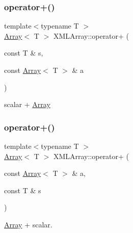 \subsubsection{\texorpdfstring{operator+()}{operator+()}\hspace{0.1cm}{\footnotesize\ttfamily [5/6]}}
{\footnotesize\ttfamily template$<$typename T $>$ \\
\mbox{\hyperlink{classXMLArray_1_1Array}{Array}}$<$ T $>$ X\+M\+L\+Array\+::operator+ (\begin{DoxyParamCaption}\item[{const T \&}]{s,  }\item[{const \mbox{\hyperlink{classXMLArray_1_1Array}{Array}}$<$ T $>$ \&}]{a }\end{DoxyParamCaption})\hspace{0.3cm}{\ttfamily [inline]}}



scalar + \mbox{\hyperlink{classXMLArray_1_1Array}{Array}} 

\mbox{\label{namespaceXMLArray_a1276f5294299ad880d814c929988bf93}} 
\subsubsection{\texorpdfstring{operator+()}{operator+()}\hspace{0.1cm}{\footnotesize\ttfamily [6/6]}}
{\footnotesize\ttfamily template$<$typename T $>$ \\
\mbox{\hyperlink{classXMLArray_1_1Array}{Array}}$<$ T $>$ X\+M\+L\+Array\+::operator+ (\begin{DoxyParamCaption}\item[{const \mbox{\hyperlink{classXMLArray_1_1Array}{Array}}$<$ T $>$ \&}]{a,  }\item[{const T \&}]{s }\end{DoxyParamCaption})\hspace{0.3cm}{\ttfamily [inline]}}



\mbox{\hyperlink{classXMLArray_1_1Array}{Array}} + scalar. 

\mbox{\label{namespaceXMLArray_abf0b390db9be6de84a10b451c1dfc18f}} 
